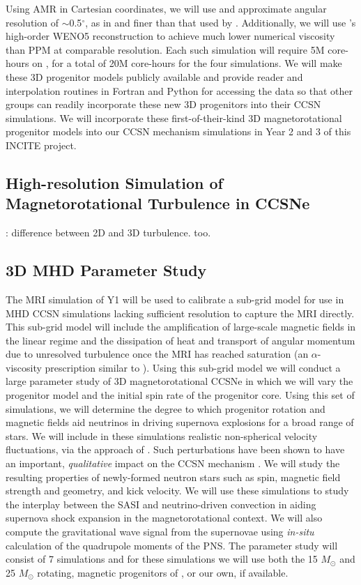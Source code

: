 Using AMR in Cartesian coordinates, we will use and approximate angular resolution of $\sim$0.5$^\circ$, as in \citep{Couch:2015a} and finer than that used by \citep{Muller:2017}.
Additionally, we will use \spark's high-order WENO5 reconstruction to achieve much lower numerical viscosity than PPM at comparable resolution.
Each such simulation will require 5M core-hours on \mira, for a total of 20M core-hours for the four simulations.
We will make these 3D progenitor models publicly available and provide reader and interpolation routines in Fortran and Python for accessing the data so that other groups can readily incorporate these new 3D progenitors into their CCSN simulations.
We will incorporate these first-of-their-kind 3D magnetorotational progenitor models into our CCSN mechanism simulations in Year 2 and 3 of this INCITE project.

\subsection{High-resolution Simulation of Magnetorotational Turbulence in CCSNe}
\label{sec:Y1hero}


\citet{Melson:2015a}: difference between 2D and 3D turbulence. \citet{Muller:2017} too.


\subsection{3D MHD Parameter Study}
\label{sec:ParamStudy}

The MRI simulation of Y1 will be used to calibrate a sub-grid model for use in MHD CCSN simulations lacking sufficient resolution to capture the MRI directly.
This sub-grid model will include the amplification of large-scale magnetic fields in the linear regime and the dissipation of heat and transport of angular momentum due to unresolved turbulence once the MRI has reached saturation (an $\alpha$-viscosity prescription similar to \citet{Thompson:2005iw}).
Using this sub-grid model we will conduct a large parameter study of 3D magnetorotational CCSNe in which we will vary the progenitor model and the initial spin rate of the progenitor core.
Using this set of simulations, we will determine the degree to which progenitor rotation and magnetic fields aid neutrinos in driving supernova explosions for a broad range of stars.
We will include in these simulations realistic non-spherical velocity fluctuations, via the approach of \citet{Chatzopoulos:2014uj}.
Such perturbations have been shown to have an important, {\it qualitative} impact on the CCSN mechanism \citep{Couch:2013bl}.
We will study the resulting properties of newly-formed neutron stars such as spin, magnetic field strength and geometry, and kick velocity.
We will use these simulations to study the interplay between the SASI and neutrino-driven convection in aiding supernova shock expansion in the magnetorotational context.
We will also compute the gravitational wave signal from the supernovae using {\it in-situ} calculation of the quadrupole moments of the PNS.
The parameter study will consist of 7 simulations and for these simulations we will use both the 15 $M_\odot$ and 25 $M_\odot$ rotating, magnetic progenitors of \citet{Heger:2005bi}, or our own, if available.

